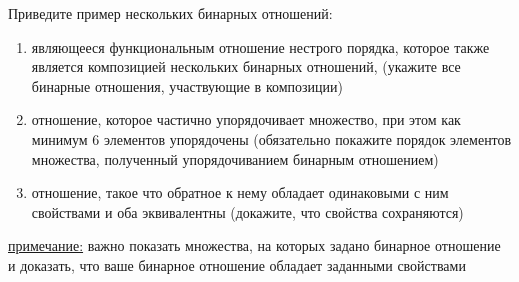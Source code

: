 \question
Приведите  пример  нескольких бинарных отношений:
\begin{enumerate}
	\renewcommand{\labelenumi}{\alph{enumi})}
	\item являющееся функциональным отношение нестрого порядка, которое также является композицией нескольких бинарных отношений, (укажите все бинарные отношения, участвующие в композиции)
	\item отношение, которое частично упорядочивает множество, при этом как минимум 6 элементов упорядочены (обязательно покажите порядок элементов множества, полученный упорядочиванием бинарным отношением)
	\item отношение, такое что обратное к нему обладает одинаковыми с ним свойствами и оба эквивалентны (докажите, что свойства сохраняются)
\end{enumerate}

\underline{примечание:} важно показать  множества, на которых задано бинарное отношение и доказать, что ваше бинарное отношение обладает заданными свойствами
